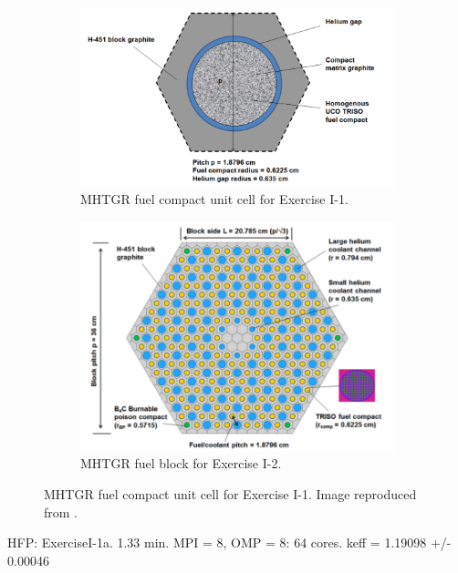 \documentclass[11pt,letterpaper]{article}
\begin{document}
	\begin{figure}[htbp!]
		\centering
		\begin{subfigure}[t]{0.4\textwidth}
			\centering
			\includegraphics[width=\linewidth]{exerciseI-1-geo}
			\caption{MHTGR fuel compact unit cell for Exercise I-1.}
			\label{fig:compact}
		\end{subfigure}
		\begin{subfigure}[t]{0.4\textwidth}
			\centering
			\includegraphics[width=\linewidth]{exerciseI-2-geo}
			\caption{MHTGR fuel block for Exercise I-2.}
			\label{fig:fuelblock}
		\end{subfigure}
		\hfill
		\caption{MHTGR fuel compact unit cell for Exercise I-1. Image reproduced from \cite{strydom_results_2015}.}
		\label{fig:fuel}
	\end{figure}

HFP:
ExerciseI-1a. 1.33 min. MPI = 8, OMP = 8: 64 cores.
keff = 1.19098 +/- 0.00046
\end{document}
